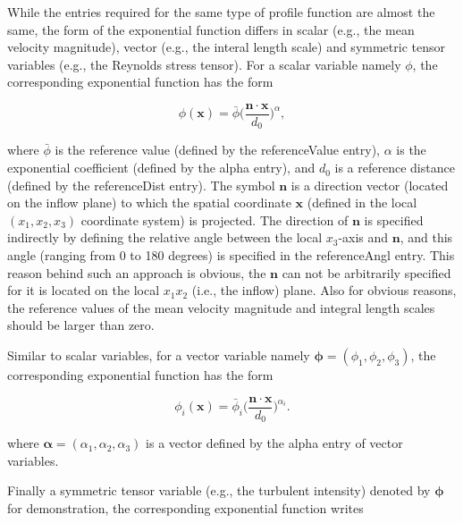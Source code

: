 \noindent While the entries required for the same type of profile function are almost the same, the form of the exponential function differs in scalar (e.g., the mean velocity magnitude), vector (e.g., the interal length scale) and symmetric tensor variables (e.g., the Reynolds stress tensor). For a scalar variable namely $\phi$, the corresponding exponential function has the form

\begin{equation} \label{exponentialForScalar}
\phi(\boldsymbol{x}) = \bar{\phi}\big(\frac{\boldsymbol{n}\cdot\boldsymbol{x}}{d_0}\big)^{\alpha},
\end{equation}

\noindent where $\bar{\phi}$ is the reference value (defined by the \textcolor{mauve}{referenceValue} entry), $\alpha$ is the exponential coefficient  (defined by the \textcolor{mauve}{alpha} entry), and $d_0$ is a reference distance (defined by the \textcolor{mauve}{referenceDist} entry). The symbol $\boldsymbol{n}$ is a direction vector (located on the inflow plane) to which the spatial coordinate $\boldsymbol{x}$ (defined in the local $(x_1,x_2,x_3)$ coordinate system) is projected. The direction of $\boldsymbol{n}$ is specified indirectly by defining the relative angle between the local $x_3$-axis and $\boldsymbol{n}$, and this angle (ranging from 0 to 180 degrees) is specified in the \textcolor{mauve}{referenceAngl} entry. This reason behind such an approach is obvious, the $\boldsymbol{n}$ can not be arbitrarily specified for it is located on the local $x_1x_2$ (i.e., the inflow) plane. Also for obvious reasons, the reference values of the mean velocity magnitude and integral length scales should be larger than zero.

Similar to scalar variables, for a vector variable namely $\boldsymbol{\phi}=(\phi_1,\phi_2,\phi_3)$, the corresponding exponential function has the form

\begin{equation} \label{exponentialForVector}
\phi_i(\boldsymbol{x}) = \bar{\phi}_i\big(\frac{\boldsymbol{n}\cdot\boldsymbol{x}}{d_0}\big)^{\alpha_i}.
\end{equation}

\noindent where $\boldsymbol{\alpha}=(\alpha_1,\alpha_2,\alpha_3)$ is a vector defined by the \textcolor{mauve}{alpha} entry of vector variables.

Finally a symmetric tensor variable (e.g., the turbulent intensity) denoted by $\boldsymbol{\phi}$ for demonstration, the corresponding exponential function writes

